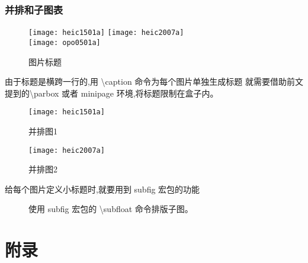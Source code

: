 \documentclass[a4paper]{ctexart}
\begin{document}
    \subsubsection{并排和子图表}
    \begin{figure}[htbp]
        \centering
        \texttt{[image: heic1501a]}
        \qquad
        \texttt{[image: heic2007a]}\\
        \texttt{[image: opo0501a]}
        \caption{图片标题}
        \label{}
    \end{figure}
    由于标题是横跨一行的,用 \textbackslash caption 命令为每个图片单独生成标题%
    就需要借助前文提到的\textbackslash parbox 或者 minipage 环境,将标题限制在盒子内。\par
    \begin{figure}[htbp]
        \centering
        \begin{minipage}[b][120pt][t]{0.45\linewidth}
            \centering
            \texttt{[image: heic1501a]}
            \caption{并排图1}
        \end{minipage}
        \qquad
        \begin{minipage}[b][120pt][t]{0.45\linewidth}
            \centering
            \texttt{[image: heic2007a]}
            \caption{并排图2}
        \end{minipage}
    \end{figure}     
    给每个图片定义小标题时,就要用到 subfig 宏包的功能    
    \begin{figure}[htbp]
        \centering
        \qquad
        \caption{使用 subfig 宏包的 \textbackslash subfloat 命令排版子图。}
        
    \end{figure}
    \newpage
    \appendix
    \section{附录}
\end{document}
